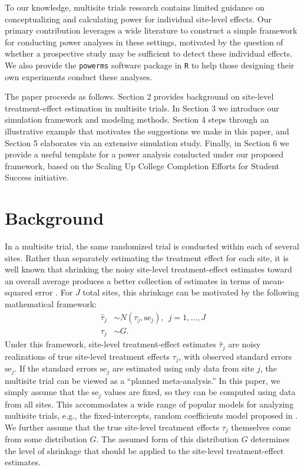 \documentclass[]{article}
\begin{document}
To our knowledge, multisite trials research contains limited guidance on conceptualizing and calculating power for individual site-level effects.
Our primary contribution leverages a wide literature to construct a simple framework for conducting power analyses in these settings, motivated by the question of whether a prospective study may be sufficient to detect these individual effects.
We also provide the \texttt{powerms} software package in \texttt{R} to help those designing their own experiments conduct these analyses.

The paper proceeds as follows.
Section 2 provides background on site-level treatment-effect estimation in multisite trials.
In Section 3 we introduce our simulation framework and modeling methods.
Section 4 steps through an illustrative example that motivates the suggestions we make in this paper, and Section 5 elaborates via an extensive simulation study.
Finally, in Section 6 we provide a useful template for a power analysis conducted under our proposed framework, based on the Scaling Up College Completion Efforts for Student Success initiative.


\section{Background}

In a multisite trial, the same randomized trial is conducted within each of several sites.
Rather than separately estimating the treatment effect for each site, it is well known that shrinking the noisy site-level treatment-effect estimates toward an overall average produces a better collection of estimates in terms of mean-squared error \citep{james1961estimation}.
For $J$ total sites, this shrinkage can be motivated by the following mathematical framework:
\begin{align*}
    \hat{\tau}_j &\sim N(\tau_j, \text{se}_j), \ \ j=1,\dots,J \\
    \tau_j &\sim G.
\end{align*}
Under this framework, site-level treatment-effect estimates $\hat{\tau}_j$ are noisy realizations of true site-level treatment effects $\tau_j$, with observed standard errors $\text{se}_j$.
If the standard errors $\text{se}_j$ are estimated using only data from site $j$, the multisite trial can be viewed as a ``planned meta-analysis.''
In this paper, we simply assume that the $\text{se}_j$ values are fixed, so they can be computed using data from all sites.
This accommodates a wide range of popular models for analyzing multisite trials, e.g., the fixed-intercepts, random coefficients model proposed in \cite{bloom2017using}.
We further assume that the true site-level treatment effects $\tau_j$ themselves come from some distribution $G$.
The assumed form of this distribution $G$ determines the level of shrinkage that should be applied to the site-level treatment-effect estimates.
\end{document}
